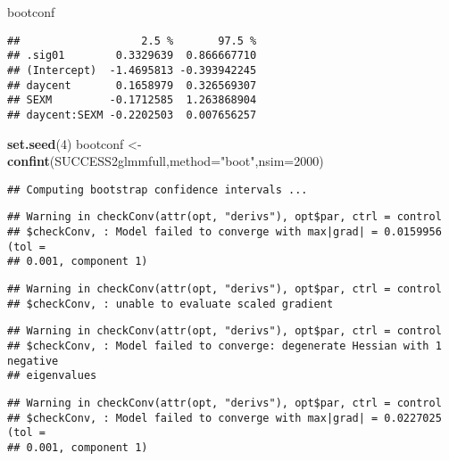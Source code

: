 \documentclass[]{article}
\newenvironment{Shaded}{\begin{snugshade}}{\end{snugshade}}
\newcommand{\KeywordTok}[1]{\textcolor[rgb]{0.13,0.29,0.53}{\textbf{#1}}}
\newcommand{\DataTypeTok}[1]{\textcolor[rgb]{0.13,0.29,0.53}{#1}}
\newcommand{\DecValTok}[1]{\textcolor[rgb]{0.00,0.00,0.81}{#1}}
\newcommand{\StringTok}[1]{\textcolor[rgb]{0.31,0.60,0.02}{#1}}
\newcommand{\NormalTok}[1]{#1}
\begin{document}
\begin{Shaded}
\begin{Highlighting}[]
\NormalTok{bootconf}
\end{Highlighting}
\end{Shaded}

\begin{verbatim}
##                   2.5 %       97.5 %
## .sig01        0.3329639  0.866667710
## (Intercept)  -1.4695813 -0.393942245
## daycent       0.1658979  0.326569307
## SEXM         -0.1712585  1.263868904
## daycent:SEXM -0.2202503  0.007656257
\end{verbatim}

\begin{Shaded}
\begin{Highlighting}[]
\KeywordTok{set.seed}\NormalTok{(}\DecValTok{4}\NormalTok{)}
\NormalTok{bootconf <-}\StringTok{ }\KeywordTok{confint}\NormalTok{(SUCCESS2glmmfull,}\DataTypeTok{method=}\StringTok{"boot"}\NormalTok{,}\DataTypeTok{nsim=}\DecValTok{2000}\NormalTok{)}
\end{Highlighting}
\end{Shaded}

\begin{verbatim}
## Computing bootstrap confidence intervals ...
\end{verbatim}

\begin{verbatim}
## Warning in checkConv(attr(opt, "derivs"), opt$par, ctrl = control
## $checkConv, : Model failed to converge with max|grad| = 0.0159956 (tol =
## 0.001, component 1)
\end{verbatim}

\begin{verbatim}
## Warning in checkConv(attr(opt, "derivs"), opt$par, ctrl = control
## $checkConv, : unable to evaluate scaled gradient
\end{verbatim}

\begin{verbatim}
## Warning in checkConv(attr(opt, "derivs"), opt$par, ctrl = control
## $checkConv, : Model failed to converge: degenerate Hessian with 1 negative
## eigenvalues
\end{verbatim}

\begin{verbatim}
## Warning in checkConv(attr(opt, "derivs"), opt$par, ctrl = control
## $checkConv, : Model failed to converge with max|grad| = 0.0227025 (tol =
## 0.001, component 1)
\end{verbatim}
\end{document}

